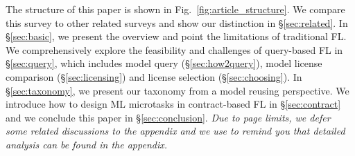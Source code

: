 The structure of this paper is shown in Fig.~\ref{fig:article_structure}. 
We compare this survey to other related surveys and show our distinction in \S\ref{sec:related}. 
In \S\ref{sec:basic}, we present the overview and point the limitations of traditional FL.
We comprehensively explore the feasibility and challenges of query-based FL in \S\ref{sec:query}, which includes model query (\S\ref{sec:how2query}), model license comparison (\S\ref{sec:licensing}) and license selection (\S\ref{sec:choosing}).
In \S\ref{sec:taxonomy}, we present our taxonomy from a model reusing perspective.
We introduce how to design ML microtasks in contract-based FL in \S\ref{sec:contract} and we conclude this paper in \S\ref{sec:conclusion}.
\emph{Due to page limits, we defer some related discussions to the appendix and we use \ddag{} to remind you that detailed analysis can be found in the appendix.}

